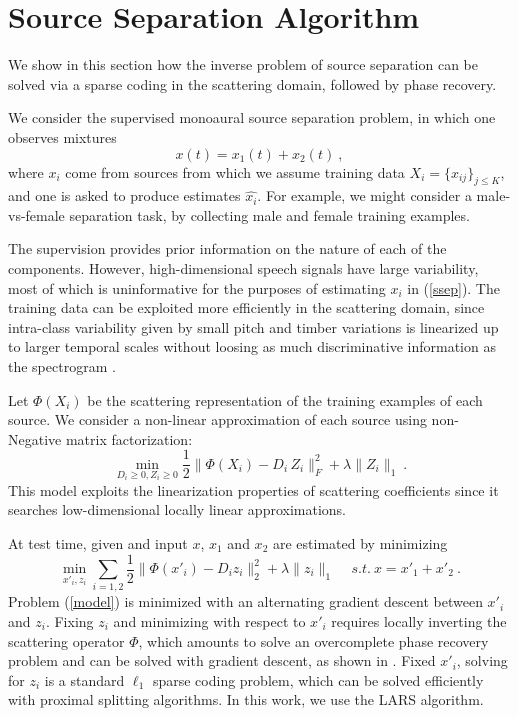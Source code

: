 \section{Source Separation Algorithm}
\label{algosec}
We show in this section how the inverse problem of source separation 
can be solved via a sparse coding in the scattering domain, followed by phase recovery.

We consider the supervised 
monoaural source separation problem, in which one observes mixtures 
\begin{equation}
\label{ssep}
x(t) = x_1(t) + x_2(t)~,
\end{equation}
where $x_i$ come from sources from which we assume training data $X_i=\{x_{ij}\}_{j \leq K}$, 
and one is asked to produce estimates $\widehat{x_i}$. 
For example, we might consider a male-vs-female separation task, by 
collecting male and female training examples. 

The supervision provides  prior information on the nature of each of the 
components. However, high-dimensional speech signals have large variability, 
most of which is uninformative for the purposes of estimating $x_i$ in (\ref{ssep}).
The training data can be exploited more efficiently in the scattering domain, since 
intra-class variability given by small pitch and timber variations is linearized up to 
larger temporal scales without loosing as much discriminative information as 
the spectrogram \cite{deepscatt,pami}.

Let $\Phi(X_i)$ be the scattering representation of the training examples of each 
source. We consider a non-linear approximation of each source using non-Negative
matrix factorization:
\begin{equation}
\min_{D_i\geq 0, Z_i\geq 0} \frac{1}{2} \| \Phi(X_i) - D_i \, Z_i \|_F^2 + \lambda \| Z_i \|_1~.
\end{equation}
This model exploits the linearization properties of scattering coefficients since it 
searches low-dimensional locally linear approximations. 

At test time, given and input $x$, $x_1$ and $x_2$ are estimated by minimizing
\begin{equation}
\label{model}
\min_{x'_i, z_i} \sum_{i=1,2} \frac{1}{2} \| \Phi(x'_i) - D_i z_i \|_2^2 + \lambda \| z_i \|_1 \quad\,s.t. ~x=x'_1 + x'_2~.
\end{equation}
Problem (\ref{model}) is minimized with an alternating gradient descent between $x'_i$ and $z_i$. 
Fixing $z_i$ and minimizing with respect to $x'_i$ requires locally inverting the scattering 
operator $\Phi$, which amounts to solve an overcomplete phase recovery problem and 
can be solved with gradient descent, as shown in \cite{bruna2013audio}. 
Fixed $x'_i$, solving for $z_i$ is a standard $\ell_1$ sparse coding problem, which can be solved 
efficiently with proximal splitting algorithms. In this work, we use the LARS algorithm. 
 
